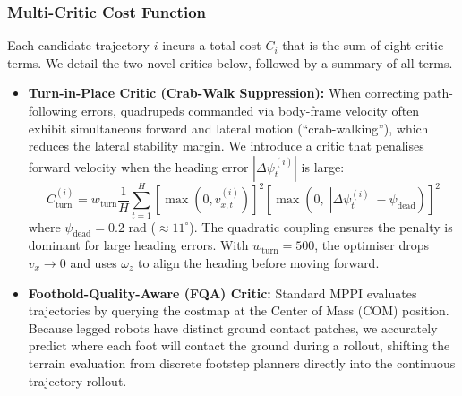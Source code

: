 \documentclass[letterpaper, 10 pt, conference]{ieeeconf}  %
\begin{document}
\subsubsection{Multi-Critic Cost Function}
Each candidate trajectory $i$ incurs a total cost $C_i$ that is the sum of eight critic terms. We detail the two novel critics below, followed by a summary of all terms.
\begin{itemize}
    \item \textbf{Turn-in-Place Critic (Crab-Walk Suppression):} When correcting path-following errors, quadrupeds commanded via body-frame velocity often exhibit simultaneous forward and lateral motion (``crab-walking''), which reduces the lateral stability margin. We introduce a critic that penalises forward velocity when the heading error $|\Delta\psi_t^{(i)}|$ is large:
    \begin{equation}
    C_{\text{turn}}^{(i)} = w_{\text{turn}} \frac{1}{H}\sum_{t=1}^{H} [\max(0, v_{x,t}^{(i)})]^2 \left[\max\!\left(0,\; |\Delta\psi_t^{(i)}| - \psi_{\text{dead}}\right)\right]^2 \label{eq:turn_critic}
    \end{equation}
    where $\psi_{\text{dead}} = 0.2$ rad ($\approx 11^\circ$). The quadratic coupling ensures the penalty is dominant for large heading errors. With $w_{\text{turn}} = 500$, the optimiser drops $v_x \to 0$ and uses $\omega_z$ to align the heading before moving forward.\\
    
    \item \textbf{Foothold-Quality-Aware (FQA) Critic:} Standard MPPI \cite{Williams2016MPPI} evaluates trajectories by querying the costmap at the Center of Mass (COM) position. Because legged robots have distinct ground contact patches, we accurately predict where each foot will contact the ground during a rollout, shifting the terrain evaluation from discrete footstep planners \cite{Kolter2008ControlArchitecture, Winkler2014PathPlanning, Li2019LearningCost} directly into the continuous trajectory rollout.
    

\end{itemize}
\end{document}
